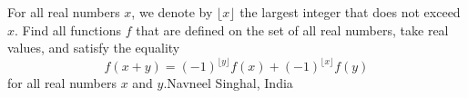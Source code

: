 For all real numbers $x$,  we denote by $\lfloor x \rfloor$ the largest integer that does not exceed $x$. Find all functions $f$ that are defined on the set of all real numbers, take real values, and satisfy the equality\[f(x + y) = (-1)^{\lfloor y \rfloor} f(x) + (-1)^{\lfloor x \rfloor} f(y)\]for all real numbers $x$ and $y$.Navneel Singhal, India